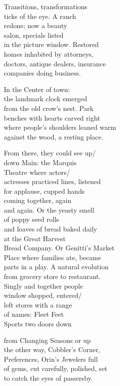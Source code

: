 \documentclass[twoside,10pt]{book}
\begin{document}
Transitions, transformations\\
ticks of the eye. A ranch\\
redone; now a beauty\\
salon, specials listed\\
in the picture window. Restored\\
homes inhabited by attorneys,\\
doctors, antique dealers, insurance\\
companies doing business.

In the Center of town:\\
the landmark clock emerged\\
from the old crow's nest. Park\\
benches with hearts carved right\\
where people's shoulders leaned warm\\
against the wood, a resting place.

From there, they could see up/\\
down Main: the Marquis\\
Theatre where actors/\\
actresses practiced lines, listened\\
for applause, cupped hands\\
coming together, again\\
and again. Or the yeasty smell\\
of poppy seed rolls\\
and loaves of bread baked daily\\
at the Great Harvest\\
Bread Company. Or Genitti's Market\\
Place where families ate, became\\
parts in a play. A natural evolution\\
from grocery store to restaurant.\\
Singly and together people\\
window shopped, entered/\\
left stores with a range\\
of names: Fleet Feet\\
Sports two doors down

from Changing Seasons or up\\
the other way, Cobbler's Corner,\\
Preferences, Orin's Jewelers full\\
of gems, cut carefully, polished, set\\
to catch the eyes of passersby.
\end{document}
